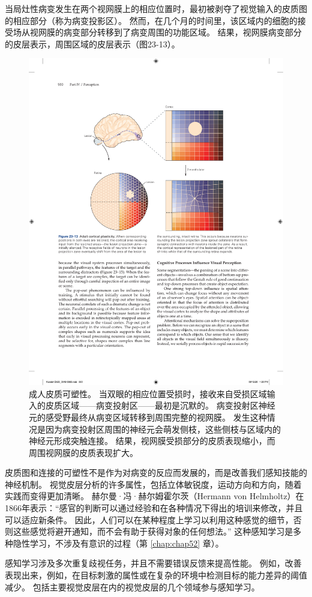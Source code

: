 当局灶性病变发生在两个视网膜上的相应位置时，最初被剥夺了视觉输入的皮质图的相应部分（称为病变投影区）。
然而，在几个月的时间里，该区域内的细胞的接受场从视网膜的病变部分转移到了病变周围的功能区域。
结果，视网膜病变部分的皮层表示，周围区域的皮层表示（图23-13）。

\begin{figure}[htbp]
	\centering
	\includegraphics[width=0.7\linewidth]{chap23/fig_23_13}
	\caption{成人皮质可塑性。 当双眼的相应位置受损时，接收来自受损区域输入的皮质区域——病变投射区——最初是沉默的。 病变投射区神经元的感受野最终从病变区域转移到周围完整的视网膜。 发生这种情况是因为病变投射区周围的神经元会萌发侧枝，这些侧枝与区域内的神经元形成突触连接。 结果，视网膜受损部分的皮质表现缩小，而周围视网膜的皮质表现扩大。}
	\label{fig:23_13}
\end{figure}


皮质图和连接的可塑性不是作为对病变的反应而发展的，而是改善我们感知技能的神经机制。
视觉皮层分析的许多属性，包括立体敏锐度，运动方向和方向，随着实践而变得更加清晰。
赫尔曼·冯·赫尔姆霍尔茨（Hermann von Helmholtz）在1866年表示：“感官的判断可以通过经验和在各种情况下得出的培训来修改，并且可以适应新条件。
因此，人们可以在某种程度上学习以利用这种感觉的细节，否则这些感觉将避开通知，而不会有助于获得对象的任何想法。” 这种感知学习是多种隐性学习，不涉及有意识的过程（第 \ref{chap:chap52} 章）。


感知学习涉及多次重复歧视任务，并且不需要错误反馈来提高性能。
例如，改善表现出来，例如，在目标刺激的属性或在复杂的环境中检测目标的能力差异的阈值减少。
包括主要视觉皮层在内的视觉皮层的几个领域参与感知学习。


